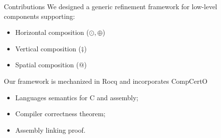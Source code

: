 \documentclass[aspectratio=1610,mathserif]{beamer}
\newcommand{\kw}[1]{\ensuremath{ \mathrm{#1} }}
\begin{document}
\begin{frame}{Contributions} %
  We designed a generic refinement framework for low-level components supporting:
  \begin{itemize}
    \item Horizontal composition ($\odot, \oplus$) %
    \item Vertical composition ($\fatsemi$) %
    \item Spatial composition ($\mathbin@$) %
  \end{itemize}

%

  \pause\vfill
  Our framework is mechanized in Rocq and incorporates CompCertO
  \begin{itemize}
    \item Languages semantics for C and assembly;
    \item Compiler correctness theorem;
    \item Assembly linking proof.
  \end{itemize}

%
\end{frame}
\end{document}
